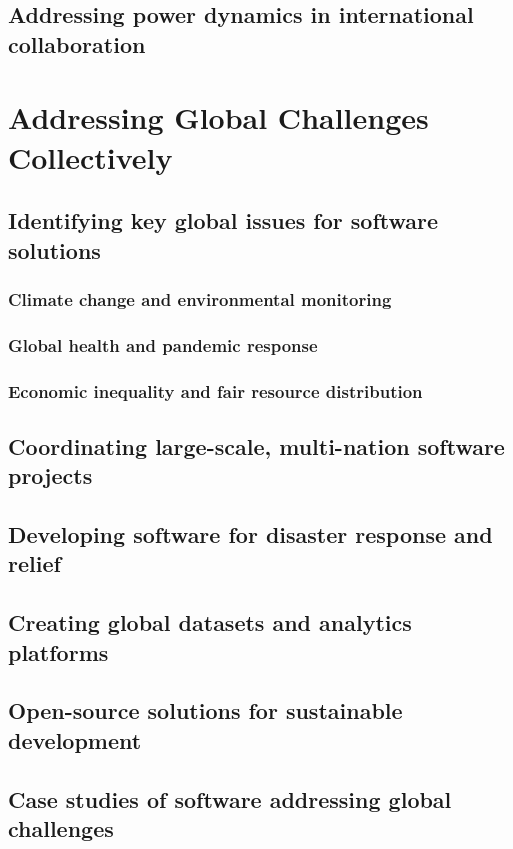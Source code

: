 \subsection{Addressing power dynamics in international collaboration}

\newpage

\section{Addressing Global Challenges Collectively}
\subsection{Identifying key global issues for software solutions}
\subsubsection{Climate change and environmental monitoring}
\subsubsection{Global health and pandemic response}
\subsubsection{Economic inequality and fair resource distribution}
\subsection{Coordinating large-scale, multi-nation software projects}
\subsection{Developing software for disaster response and relief}
\subsection{Creating global datasets and analytics platforms}
\subsection{Open-source solutions for sustainable development}
\subsection{Case studies of software addressing global challenges}

\newpage

